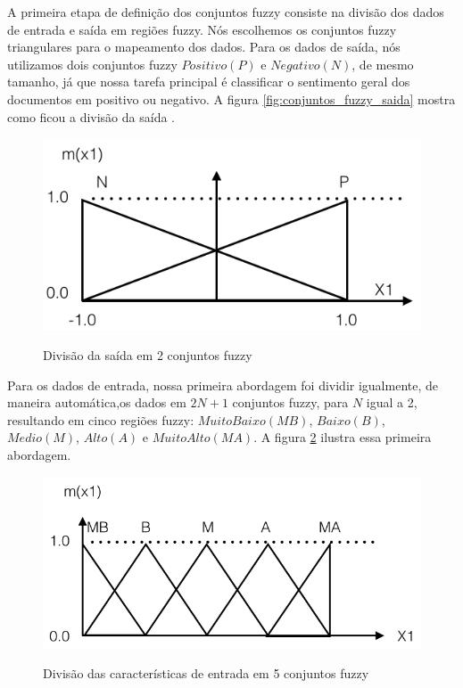 A primeira etapa de definição dos conjuntos fuzzy consiste na divisão dos dados de entrada e saída em regiões fuzzy. Nós escolhemos os conjuntos fuzzy triangulares para o mapeamento dos dados. Para os dados de saída, nós utilizamos dois conjuntos fuzzy $Positivo (P)$ e $Negativo (N)$, de mesmo tamanho, já que nossa tarefa principal é classificar o sentimento geral dos documentos em positivo ou negativo. A figura \ref{fig:conjuntos_fuzzy_saida} mostra como ficou a divisão da saída \cite{wang1992generating}. 

\begin{figure}[h]
\caption{Divisão da saída em 2 conjuntos fuzzy}
\centering
\includegraphics[scale=0.45]{conjuntos_fuzzy_saida.png}
\label{figura:conjuntos_fuzzy_saida}
\end{figure}

Para os dados de entrada, nossa primeira abordagem foi dividir igualmente, de maneira automática,os dados em $2N + 1$ \cite{wang1992generating} conjuntos fuzzy, para $N$ igual a 2, resultando em cinco regiões fuzzy: $Muito Baixo (MB)$, $Baixo (B)$, $Medio (M)$, $Alto (A)$ e $Muito Alto (MA)$. A figura \ref{figura:cinco_conjuntos_fuzzy} ilustra essa primeira abordagem.

\begin{figure}[h]
\caption{Divisão das características de entrada em 5 conjuntos fuzzy}
\centering
\includegraphics[scale=0.45]{cinco_conjuntos_fuzzy.png}
\label{figura:cinco_conjuntos_fuzzy}
\end{figure}

